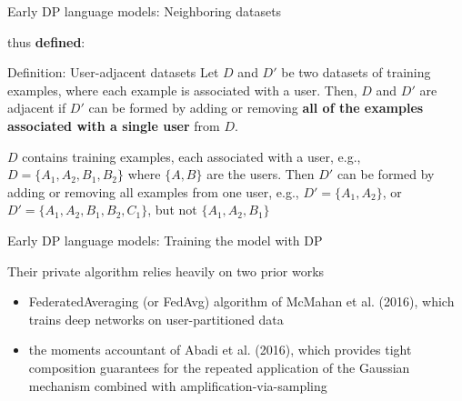 \documentclass[12pt,aspectratio=169,handout]{beamer}
\begin{document}
\begin{frame}{Early DP language models: Neighboring datasets}

\citet{McMahan.et.al.2018.ICLR} thus \textbf{defined}:

\begin{block}{Definition: User-adjacent datasets}
\small
Let $D$ and $D'$ be two datasets of training examples, where each example is associated with a user. Then, $D$ and $D'$ are adjacent if $D'$ can be formed by adding or removing \textbf{all of the examples associated with a single user} from $D$.
\end{block}

$D$ contains training examples, each associated with a user, e.g., $D = \{A_1, A_2, B_1, B_2\}$ where $\{A, B\}$ are the users. Then $D'$ can be formed by adding or removing all examples from one user, e.g., $D' = \{A_1, A_2\}$, or $D' = \{A_1, A_2, B_1, B_2, C_1\}$, but not $\{A_1, A_2, B_1\}$



\end{frame}


\begin{frame}{Early DP language models: Training the model with DP}

Their private algorithm relies heavily on two prior works
\begin{itemize}
\item FederatedAveraging (or FedAvg) algorithm of McMahan et al. (2016), which trains deep networks on user-partitioned data
\item the moments accountant of Abadi et al. (2016), which provides tight composition guarantees for the repeated application of the Gaussian mechanism combined with amplification-via-sampling
\end{itemize}


\end{frame}
\end{document}
